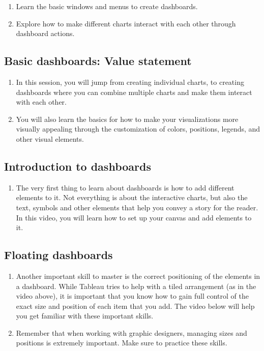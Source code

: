 \documentclass[
]{book}
\providecommand{\tightlist}{%
  \setlength{\itemsep}{0pt}\setlength{\parskip}{0pt}}
\begin{document}
\begin{enumerate}
\def\labelenumi{\arabic{enumi}.}
\tightlist
\item
  Learn the basic windows and menus to create dashboards.
\item
  Explore how to make different charts interact with each other through dashboard actions.
\end{enumerate}

\hypertarget{basic-dashboards-value-statement}{%
\subsection{Basic dashboards: Value statement}\label{basic-dashboards-value-statement}}

\begin{enumerate}
\def\labelenumi{\arabic{enumi}.}
\tightlist
\item
  In this session, you will jump from creating individual charts, to creating dashboards where you can combine multiple charts and make them interact with each other.
\item
  You will also learn the basics for how to make your visualizations more visually appealing through the customization of colors, positions, legends, and other visual elements.
\end{enumerate}

\hypertarget{introduction-to-dashboards}{%
\subsection{Introduction to dashboards}\label{introduction-to-dashboards}}

\begin{enumerate}
\def\labelenumi{\arabic{enumi}.}
\tightlist
\item
  The very first thing to learn about dashboards is how to add different elements to it. Not everything is about the interactive charts, but also the text, symbols and other elements that help you convey a story for the reader. In this video, you will learn how to set up your canvas and add elements to it.
\end{enumerate}

\hypertarget{floating-dashboards}{%
\subsection{Floating dashboards}\label{floating-dashboards}}

\begin{enumerate}
\def\labelenumi{\arabic{enumi}.}
\tightlist
\item
  Another important skill to master is the correct positioning of the elements in a dashboard. While Tableau tries to help with a tiled arrangement (as in the video above), it is important that you know how to gain full control of the exact size and position of each item that you add. The video below will help you get familiar with these important skills.
\item
  Remember that when working with graphic designers, managing sizes and positions is extremely important. Make sure to practice these skills.
\end{enumerate}
\end{document}
